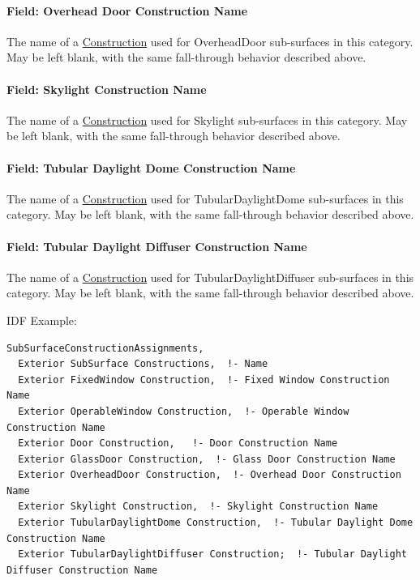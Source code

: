 \paragraph{Field: Overhead Door Construction Name}\label{subsurfaceconstructionassignments-field-overhead-door-construction-name}

The name of a \hyperref[construction-000]{Construction} used for OverheadDoor sub-surfaces in this category. May be left blank, with the same fall-through behavior described above.

\paragraph{Field: Skylight Construction Name}\label{subsurfaceconstructionassignments-field-skylight-construction-name}

The name of a \hyperref[construction-000]{Construction} used for Skylight sub-surfaces in this category. May be left blank, with the same fall-through behavior described above.

\paragraph{Field: Tubular Daylight Dome Construction Name}\label{subsurfaceconstructionassignments-field-tubular-daylight-dome-construction-name}

The name of a \hyperref[construction-000]{Construction} used for TubularDaylightDome sub-surfaces in this category. May be left blank, with the same fall-through behavior described above.

\paragraph{Field: Tubular Daylight Diffuser Construction Name}\label{subsurfaceconstructionassignments-field-tubular-daylight-diffuser-construction-name}

The name of a \hyperref[construction-000]{Construction} used for TubularDaylightDiffuser sub-surfaces in this category. May be left blank, with the same fall-through behavior described above.

IDF Example:

\begin{lstlisting}
SubSurfaceConstructionAssignments,
  Exterior SubSurface Constructions,  !- Name
  Exterior FixedWindow Construction,  !- Fixed Window Construction Name
  Exterior OperableWindow Construction,  !- Operable Window Construction Name
  Exterior Door Construction,   !- Door Construction Name
  Exterior GlassDoor Construction,  !- Glass Door Construction Name
  Exterior OverheadDoor Construction,  !- Overhead Door Construction Name
  Exterior Skylight Construction,  !- Skylight Construction Name
  Exterior TubularDaylightDome Construction,  !- Tubular Daylight Dome Construction Name
  Exterior TubularDaylightDiffuser Construction;  !- Tubular Daylight Diffuser Construction Name
\end{lstlisting}

